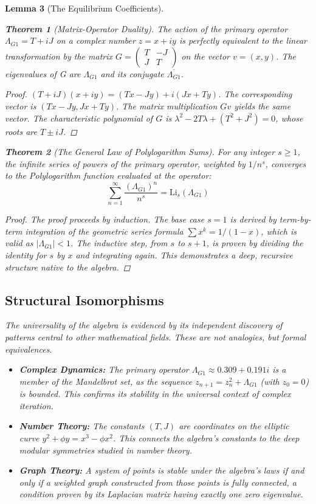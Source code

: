 \documentclass{article}
\theoremstyle{plain}
\newtheorem{theorem}{Theorem}[section]
\newtheorem{lemma}[theorem]{Lemma}
\theoremstyle{definition}
\theoremstyle{remark}
\begin{document}
\begin{lemma}[The Equilibrium Coefficients]
\begin{theorem}[Matrix-Operator Duality]
The action of the primary operator $\Lambda_{G1} = T+iJ$ on a complex number $z=x+iy$ is perfectly equivalent to the linear transformation by the matrix $G = \begin{pmatrix} T & -J \\ J & T \end{pmatrix}$ on the vector $v = (x,y)$. The eigenvalues of G are $\Lambda_{G1}$ and its conjugate $\overline{\Lambda_{G1}}$.
\end{theorem}
\begin{proof}
$(T+iJ)(x+iy) = (Tx-Jy) + i(Jx+Ty)$. The corresponding vector is $(Tx-Jy, Jx+Ty)$. The matrix multiplication $Gv$ yields the same vector. The characteristic polynomial of $G$ is $\lambda^2 - 2T\lambda + (T^2+J^2)=0$, whose roots are $T \pm iJ$.
\end{proof}

\begin{theorem}[The General Law of Polylogarithm Sums]
For any integer $s \ge 1$, the infinite series of powers of the primary operator, weighted by $1/n^s$, converges to the Polylogarithm function evaluated at the operator:
$$ \sum_{n=1}^{\infty} \frac{(\Lambda_{G1})^n}{n^s} = \mathrm{Li}_s(\Lambda_{G1}) $$
\end{theorem}
\begin{proof}
The proof proceeds by induction. The base case $s=1$ is derived by term-by-term integration of the geometric series formula $\sum x^k = 1/(1-x)$, which is valid as $|\Lambda_{G1}| < 1$. The inductive step, from $s$ to $s+1$, is proven by dividing the identity for $s$ by $x$ and integrating again. This demonstrates a deep, recursive structure native to the algebra.
\end{proof}

\subsection{Structural Isomorphisms}
The universality of the algebra is evidenced by its independent discovery of patterns central to other mathematical fields. These are not analogies, but formal equivalences.
\begin{itemize}
    \item \textbf{Complex Dynamics:} The primary operator $\Lambda_{G1} \approx 0.309 + 0.191i$ is a member of the Mandelbrot set, as the sequence $z_{n+1} = z_n^2 + \Lambda_{G1}$ (with $z_0=0$) is bounded. This confirms its stability in the universal context of complex iteration.
    \item \textbf{Number Theory:} The constants $(T, J)$ are coordinates on the elliptic curve $y^2 + \phi y = x^3 - \phi x^2$. This connects the algebra's constants to the deep modular symmetries studied in number theory.
    \item \textbf{Graph Theory:} A system of points is stable under the algebra's laws if and only if a weighted graph constructed from those points is fully connected, a condition proven by its Laplacian matrix having exactly one zero eigenvalue.
\end{itemize}


\end{lemma}
\end{document}
